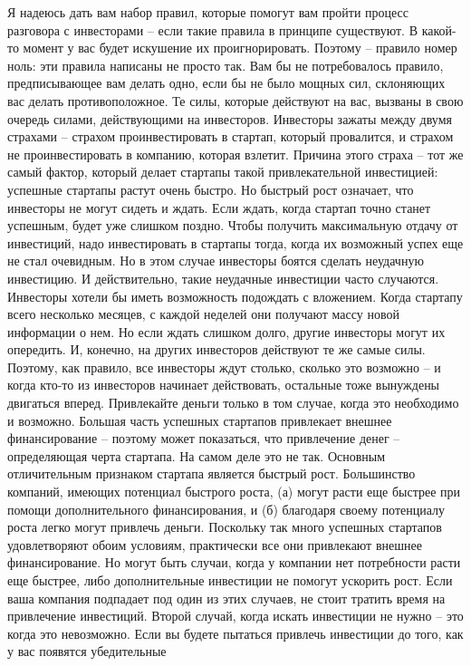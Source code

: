 \documentclass[ebook,12pt,oneside,openany]{memoir}
\begin{document}
Я надеюсь дать вам набор правил, которые помогут вам пройти процесс
разговора с инвесторами – если такие правила в принципе существуют. В
какой-то момент у вас будет искушение их проигнорировать. Поэтому –
правило номер ноль: эти правила написаны не просто так. Вам бы не
потребовалось правило, предписывающее вам делать одно, если бы не было
мощных сил, склоняющих вас делать противоположное. Те силы, которые
действуют на вас, вызваны в свою очередь силами, действующими на
инвесторов. Инвесторы зажаты между двумя страхами – страхом
проинвестировать в стартап, который провалится, и страхом не
проинвестировать в компанию, которая взлетит. Причина этого страха –
тот же самый фактор, который делает стартапы такой привлекательной
инвестицией: успешные стартапы растут очень быстро. Но быстрый рост
означает, что инвесторы не могут сидеть и ждать. Если ждать, когда
стартап точно станет успешным, будет уже слишком поздно. Чтобы
получить максимальную отдачу от инвестиций, надо инвестировать в
стартапы тогда, когда их возможный успех еще не стал очевидным. Но в
этом случае инвесторы боятся сделать неудачную инвестицию. И
действительно, такие неудачные инвестиции часто случаются. Инвесторы
хотели бы иметь возможность подождать с вложением. Когда стартапу
всего несколько месяцев, с каждой неделей они получают массу новой
информации о нем. Но если ждать слишком долго, другие инвесторы могут
их опередить. И, конечно, на других инвесторов действуют те же самые
силы. Поэтому, как правило, все инвесторы ждут столько, сколько это
возможно – и когда кто-то из инвесторов начинает действовать,
остальные тоже вынуждены двигаться вперед. Привлекайте деньги только в
том случае, когда это необходимо и возможно. Большая часть успешных
стартапов привлекает внешнее финансирование – поэтому может
показаться, что привлечение денег – определяющая черта стартапа. На
самом деле это не так. Основным отличительным признаком стартапа
является быстрый рост. Большинство компаний, имеющих потенциал
быстрого роста, (а) могут расти еще быстрее при помощи дополнительного
финансирования, и (б) благодаря своему потенциалу роста легко могут
привлечь деньги. Поскольку так много успешных стартапов удовлетворяют
обоим условиям, практически все они привлекают внешнее финансирование.
Но могут быть случаи, когда у компании нет потребности расти еще
быстрее, либо дополнительные инвестиции не помогут ускорить рост. Если
ваша компания подпадает под один из этих случаев, не стоит тратить
время на привлечение инвестиций. Второй случай, когда искать
инвестиции не нужно – это когда это невозможно. Если вы будете
пытаться привлечь инвестиции до того, как у вас появятся убедительные
\end{document}
